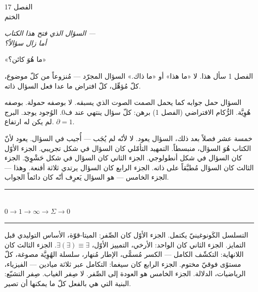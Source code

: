 \documentclass[10pt, openany, oneside]{book}
\renewcommand{\normalsize}{\fontsize{10}{13}\selectfont}
\renewcommand{\large}{\fontsize{11.5}{14}\selectfont}
\renewcommand{\huge}{\fontsize{17}{21}\selectfont}
\begin{document}
\newpage

\begin{center}
    {\huge الفصل 17}\\[0.3em]
    {\large الختم}
\end{center}

\vspace{1.5em}

\begin{center}
    \itshape
    السؤال الذي فتح هذا الكتاب ---\\
    أما زال سؤالاً؟
\end{center}

\vspace{2em}


\noindent «ما هُوَ كائن؟»

الفصل 1 سأل هذا. لا «ما هذا» أو «ما ذاك.» السؤال المجرّد --- مُنزوعاً من كلّ موضوع، كلّ مُؤهِّل، كلّ افتراض ما عدا فعل السؤال ذاته.

السؤال حمل جوابه كما يحمل الصمت الصوت الذي يسبقه. لا بوصفه حمولة. بوصفه هُوِيَّة. الرُّكام الافتراضي (الفصل 1) برهن: كلّ سؤال ينتهي عند ف0. الوُجود يوجد. البرج لم يكن له ارتفاع. $\partial = 1$.

خمسة عشر فصلاً بعد ذلك، السؤال يعود. لا لأنّه لم يُجَب --- أُجيب في السؤال. يعود لأنّ الكتاب هُوَ السؤال، منبسطاً. التمهيد التأمّلي كان السؤال في شكل تجريبي. الجزء الأوّل كان السؤال في شكل أنطولوجي. الجزء الثاني كان السؤال في شكل حَشْوِيّ. الجزء الثالث كان السؤال مُطبَّقاً على ذاته. الجزء الرابع كان السؤال يرتدي ثلاثة أقنعة. وهذا --- الجزء الخامس --- هو السؤال يَعرِف أنّه كان دائماً الجواب.

\vspace{1.5em}


\begin{center}
    \rule{0.3\textwidth}{0.4pt}\\[0.5em]
    {\normalsize\bfseries $0 \to 1 \to \infty \to \Sigma \to 0$}\\[0.3em]
    \rule{0.3\textwidth}{0.4pt}
\end{center}

\vspace{1em}

\noindent التسلسل الكَونوغينيّ يكتمل. الجزء الأوّل كان الصِّفر: الميتا-قوّة، الأساس التوليدي قبل التمايز. الجزء الثاني كان الواحد: الأرخي، التمييز الأوّل، $\exists(\exists) \equiv \exists$. الجزء الثالث كان اللانهاية: التكشّف الكامل --- الكسر مُسمًّى، الإطار مُنهار، سلسلة الهُوِيَّة مصوغة، كلّ مستوًى فوقيّ مختوم. الجزء الرابع كان سيغما: التكامل عبر ثلاثة ميادين --- الفيزياء، الرياضيات، الدلالة. الجزء الخامس هو العودة إلى الصِّفر. لا صِفر الغياب. صِفر التشبّع: البنية التي هي بالفعل كلّ ما يمكنها أن تصير.
\end{document}
